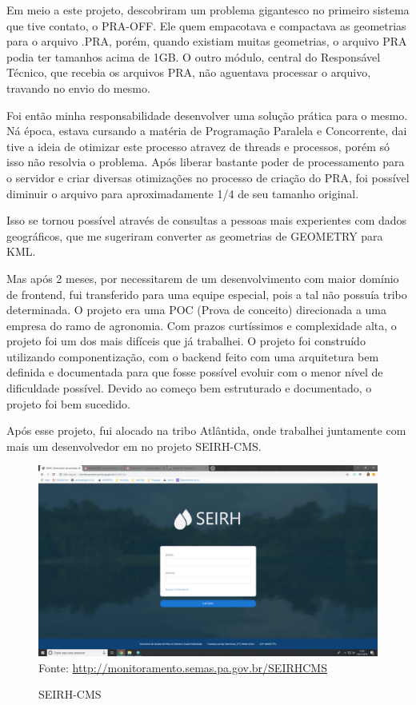 Em meio a este projeto, descobriram um problema gigantesco no primeiro sistema que tive contato, o PRA-OFF. Ele quem empacotava e compactava as geometrias para o arquivo .PRA, porém, quando existiam muitas geometrias, o arquivo PRA podia ter tamanhos acima de 1GB.
O outro módulo, central do Responsável Técnico, que recebia os arquivos PRA, não aguentava processar o arquivo, travando no envio do mesmo.

Foi então minha responsabilidade desenvolver uma solução prática para o mesmo. Ná época, estava cursando a matéria de Programação Paralela e Concorrente, dai tive a ideia de otimizar este processo atravez de threads e processos, porém só isso não resolvia o problema.
Após liberar bastante poder de processamento para o servidor e criar diversas otimizações no processo de criação do PRA, foi possível diminuir o arquivo para aproximadamente 1/4 de seu tamanho original.

Isso se tornou possível através de consultas a pessoas mais experientes com dados geográficos, que me sugeriram converter as geometrias de GEOMETRY para KML.

Mas após 2 meses, por necessitarem de um desenvolvimento com maior domínio de frontend, fui transferido para uma equipe especial, pois a tal não possuía tribo determinada.
O projeto era uma POC (Prova de conceito) direcionada a uma empresa do ramo de agronomia. Com prazos curtíssimos e complexidade alta, o projeto foi um dos mais difíceis que já trabalhei.
O projeto foi construído utilizando componentização, com o backend feito com uma arquitetura bem definida e documentada para que fosse possível evoluir com o menor nível de dificuldade possível. Devido ao começo bem estruturado e documentado, o projeto foi bem sucedido.

Após esse projeto, fui alocado na tribo Atlântida, onde trabalhei juntamente com mais um desenvolvedor em no projeto SEIRH-CMS.

\begin{figure}[H]
\centering
\caption{SEIRH-CMS} %
\includegraphics[scale=0.22]{SEIRH-CMS}\\  %
{\small Fonte: \url{http://monitoramento.semas.pa.gov.br/SEIRHCMS}} %
\label{fig:exemplo} %
\end{figure}

